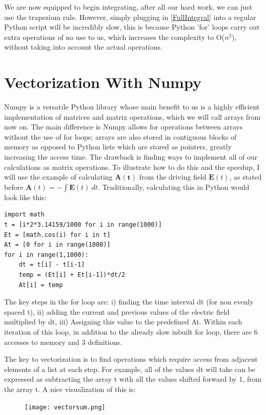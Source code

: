 \documentclass[11pt,a4paper]{report}
\begin{document}
We are now equipped to begin integrating, after all our hard work, we can just use the trapezium rule. However, simply plugging in \eqref{FullIntegral} into a regular Python script will be incredibly slow, this is because Python 'for' loops carry out extra operations of no use to us, which increases the complexity to O($n^2$), without taking into account the actual operations.

\section{Vectorization With Numpy}
Numpy is a versatile Python library whose main benefit to us is a highly efficient implementation of matrices and matrix operations, which we will call arrays from now on. The main difference is Numpy allows for operations between arrays without the use of for loops; arrays are also stored in contiguous blocks of memory as opposed to Python lists which are stored as pointers, greatly increasing the access time. The drawback is finding ways to implement all of our calculations as matrix operations. To illustrate how to do this and the speedup, I will use the example of calculating $\mathbf{A(t)}$ from the driving field $\mathbf{E}(t)$, as stated before $\mathbf{A}(t) = -\int \mathbf{E}(t) \: dt$. Traditionally, calculating this in Python would look like this:
\begin{verbatim}
import math
t = [i*2*3.14159/1000 for i in range(1000)]
Et = [math.cos(i) for i in t]
At = [0 for i in range(1000)]
for i in range(1,1000):
	dt = t[i] - t[i-1]
	temp = (Et[i] + Et[i-1])*dt/2
	At[i] = temp
\end{verbatim}
The key steps in the for loop are: i) finding the time interval dt (for non evenly spaced t), ii) adding the current and previous values of the electric field multiplied by dt, iii) Assigning this value to the predefined At. Within each iteration of this loop, in addition to the already slow inbuilt for loop, there are 6 accesses to memory and 3 definitions.
\newpage
{}
\thispagestyle{fancy}
\renewcommand{\headrulewidth}{0pt}
\fancyhead{}
\setlength{\footskip}{0pt}

The key to vectorization is to find operations which require access from adjacent elements of a list at each step. For example, all of the values dt will take can be expressed as subtracting the array t with all the values shifted forward by 1, from the array t. A nice visualization of this is:
\begin{figure}[h]
\centering
\texttt{[image: vectorsum.png]}
\end{figure}
\end{document}
